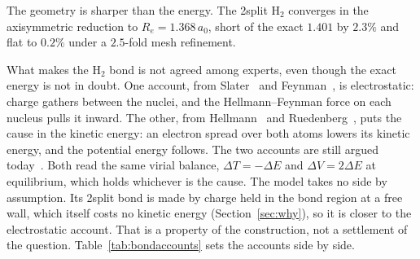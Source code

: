\documentclass[11pt]{article}
\begin{document}
The geometry is sharper than the energy. The 2split H$_2$ converges in the axisymmetric reduction to
$R_e = 1.368\,a_0$, short of the exact $1.401$ by $2.3\%$ and flat to $0.2\%$ under a $2.5$-fold
mesh refinement.

What makes the H$_2$ bond is not agreed among experts, even though the exact energy is not in
doubt. One account, from Slater~\cite{slater} and Feynman~\cite{feynman}, is electrostatic: charge
gathers between the nuclei, and the Hellmann--Feynman force on each nucleus pulls it inward. The
other, from Hellmann~\cite{hellmann} and Ruedenberg~\cite{ruedenberg}, puts the cause in the kinetic
energy: an electron spread over both atoms lowers its kinetic energy, and the potential energy
follows. The two accounts are still argued
today~\cite{bacskay}. Both read the same virial balance, $\Delta T = -\Delta E$ and $\Delta V = 2\Delta E$
at equilibrium, which holds whichever is the cause. The model takes no side by assumption. Its
2split bond is made by charge held in the bond region at a free wall, which itself costs no kinetic
energy (Section~\ref{sec:why}), so it is closer to the electrostatic account. That is a property of the
construction, not a settlement of the question. Table~\ref{tab:bondaccounts} sets the accounts side by side.
\end{document}
